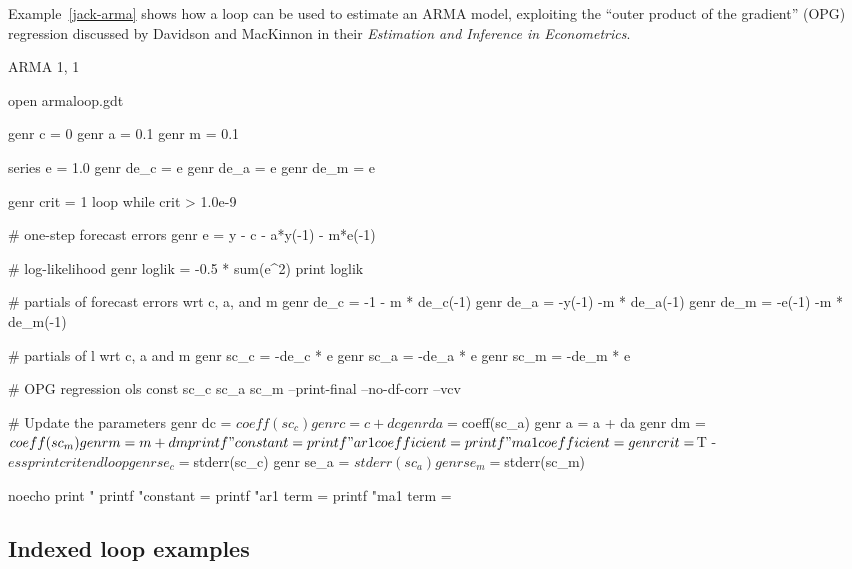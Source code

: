 Example~\ref{jack-arma} shows how a loop can be used to
estimate an ARMA model, exploiting the ``outer product of the
gradient'' (OPG) regression discussed by Davidson and MacKinnon in
their \emph{Estimation and Inference in Econometrics}.

\begin{script}[htbp]
  \caption{ARMA 1, 1}
  \label{jack-arma}

\begin{code}
	open armaloop.gdt

	genr c = 0
	genr a = 0.1
	genr m = 0.1

	series e = 1.0
	genr de_c = e
	genr de_a = e
	genr de_m = e

	genr crit = 1
	loop while crit > 1.0e-9

	   # one-step forecast errors
	   genr e = y - c - a*y(-1) - m*e(-1)  

	   # log-likelihood 
	   genr loglik = -0.5 * sum(e^2)
	   print loglik

	   # partials of forecast errors wrt c, a, and m
	   genr de_c = -1 - m * de_c(-1) 
	   genr de_a = -y(-1) -m * de_a(-1)
	   genr de_m = -e(-1) -m * de_m(-1)
   
	   # partials of l wrt c, a and m
	   genr sc_c = -de_c * e
	   genr sc_a = -de_a * e
	   genr sc_m = -de_m * e
   
	   # OPG regression
	   ols const sc_c sc_a sc_m --print-final --no-df-corr --vcv

	   # Update the parameters
	   genr dc = $coeff(sc_c) 
	   genr c = c + dc
	   genr da = $coeff(sc_a) 
	   genr a = a + da
	   genr dm = $coeff(sc_m) 
	   genr m = m + dm

	   printf "  constant        = %
	   printf "  ar1 coefficient = %
	   printf "  ma1 coefficient = %

	   genr crit = $T - $ess
	   print crit
	endloop

	genr se_c = $stderr(sc_c)
	genr se_a = $stderr(sc_a)
	genr se_m = $stderr(sc_m)

	noecho
	print "
	printf "constant = %
	printf "ar1 term = %
	printf "ma1 term = %
\end{code}
\end{script}



\subsection{Indexed loop examples}


